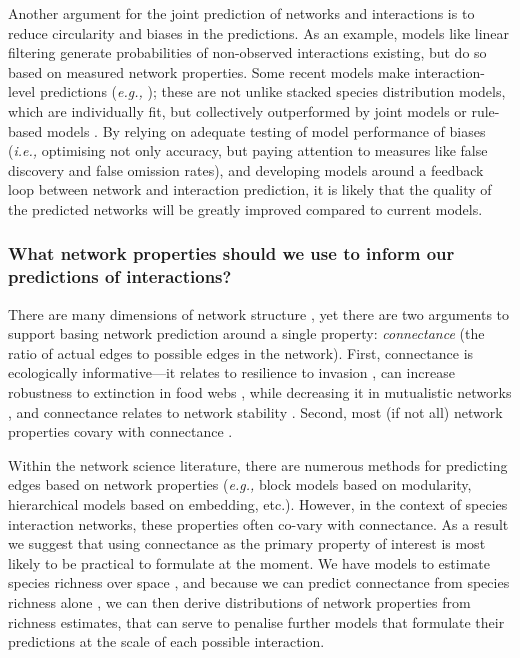 Another argument for the joint prediction of networks and interactions
is to reduce circularity and biases in the predictions. As an example,
models like linear filtering \cite{Stock2017LinFil} generate
probabilities of non-observed interactions existing, but do so based on
measured network properties. Some recent models make interaction-level
predictions (\emph{e.g.,} \cite{Gravel2019BriElt}); these are not unlike stacked
species distribution models, which are individually fit, but
collectively outperformed by joint models or rule-based models
\cite{Zurell2020TesSpe}. By relying on adequate testing of model
performance of biases (\emph{i.e.,} optimising not only accuracy, but paying
attention to measures like false discovery and false omission rates),
and developing models around a feedback loop between network and
interaction prediction, it is likely that the quality of the predicted
networks will be greatly improved compared to current models.

\subsubsection{What network properties should we use to inform our
predictions of
interactions?}\label{what-network-properties-should-we-use-to-inform-our-predictions-of-interactions}

There are many dimensions of network structure \cite{Delmas2018AnaEco},
yet there are two arguments to support basing network prediction around
a single property: \emph{connectance} (the ratio of actual edges to
possible edges in the network). First, connectance is ecologically
informative---it relates to resilience to invasion \cite{Baiser2010ConDet,
Smith-Ramesh2016GloSyn}, can increase robustness to extinction in
food webs \cite{Dunne2002NetStr}, while decreasing it in mutualistic
networks \cite{Vieira2015SimSto}, and connectance relates to network
stability \cite{Landi2018ComSta}. Second, most (if not all) network
properties covary with connectance \cite{Poisot2014WheEco,
Dunne2002FooStr}.

Within the network science literature, there are numerous methods for
predicting edges based on network properties (\emph{e.g.,} block models
\cite{Yen2020ComDet} based on modularity, hierarchical models
\cite{Kawakatsu2021EmeHie} based on embedding, etc.). However, in the
context of species interaction networks, these properties often co-vary
with connectance. As a result we suggest that using connectance as the
primary property of interest is most likely to be practical to formulate
at the moment. We have models to estimate species richness over space
\cite{Jenkins2013GloPat}, and because we can predict connectance from
species richness alone \cite{MacDonald2020RevLin}, we can then derive
distributions of network properties from richness estimates, that can
serve to penalise further models that formulate their predictions at the
scale of each possible interaction.

